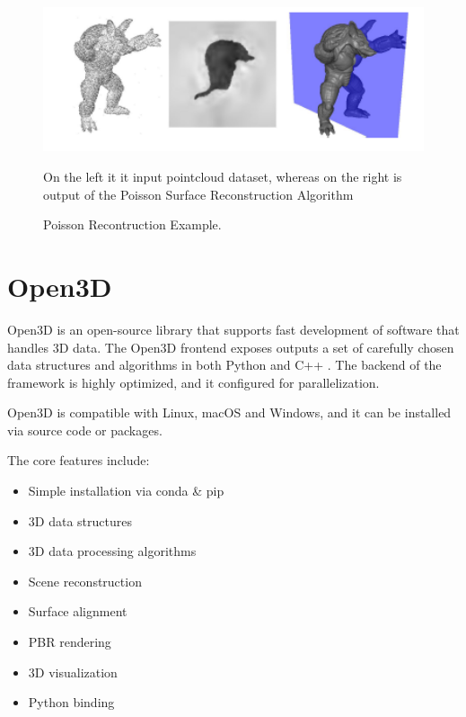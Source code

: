 \documentclass[12pt]{report}
\begin{document}
\begin{figure}[H]%
  \centering
  \includegraphics[width=1\textwidth]{poisson_example.png}
 \caption{Poisson Recontruction Example.} On the left it it input pointcloud dataset, whereas on the right is output of the Poisson Surface Reconstruction Algorithm\cite[]{Poisson}
 \label{fig:Poisson_def} 
\end{figure}



\newpage
\section{Open3D}
\label{section:Open3D}
Open3D is an open-source library that supports fast development of software that handles 3D data.
The Open3D frontend exposes outputs a set of carefully chosen data structures and algorithms in both Python and C++ . 
The backend of the framework is highly optimized, and it configured for parallelization.

Open3D is compatible with Linux, macOS and Windows, and it can be installed via source code or packages. 

The core features include: 
\begin{multicols}{2}
  \begin{itemize}
    \itemsep0em 
    \item Simple installation via conda \& pip
    \item 3D data structures
    \item 3D data processing algorithms
    \item Scene reconstruction
    \item Surface alignment
    \item PBR rendering
    \item 3D visualization
    \item Python binding
  \end{itemize}
  \end{multicols}
\end{document}
